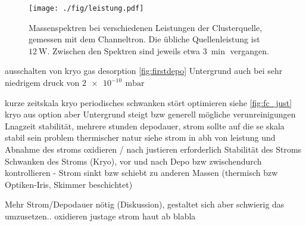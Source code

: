 \begin{figure}
  \centering
  \texttt{[image: ./fig/leistung.pdf]}
  \caption{Massenspektren bei verschiedenen Leistungen der Clusterquelle, gemessen mit dem Channeltron. Die übliche Quellenleistung ist $\SI{12}{\watt}$. Zwischen den Spektren sind jeweils etwa $\SI{3}{\min}$ vergangen.}
  \label{fig:leistung}
\end{figure}
ausschalten von kryo gas desorption \ref{fig:firstdepo} Untergrund auch bei sehr niedrigem druck von $\SI{2e-10}{}\,\text{mbar}$ \cite{Senz.2009}



kurze zeitskala kryo periodisches schwanken stört optimieren siehe \ref{fig:fc_just}
kryo aus option aber Untergrund steigt bzw generell mögliche verunreinigungen
Lnagzeit stabilität, mehrere stunden depodauer, strom sollte auf die se skala stabil sein
problem thermischer natur siehe strom in abh von leistung
und Abnahme des stroms oxidieren / nach justieren erforderlich
Stabilität des Stroms
Schwanken des Stroms (Kryo), vor und nach Depo bzw zwischendurch kontrollieren -
Strom sinkt bzw schiebt zu anderen Massen (thermisch bzw Optiken-Iris, Skimmer beschichtet)

Mehr Strom/Depodauer nötig (Diskussion), gestaltet sich aber schwierig das umzusetzen..
oxidieren justage strom haut ab blabla
